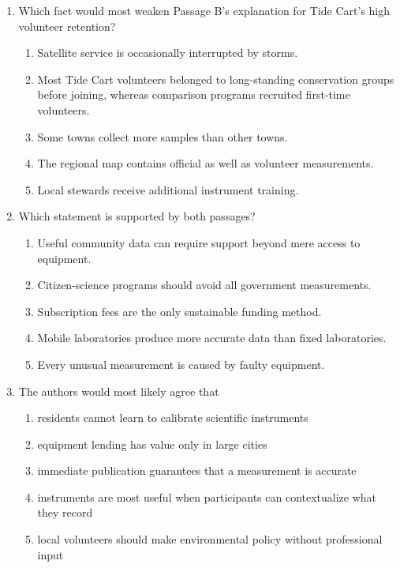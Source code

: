 \begin{enumerate}
\item Which fact would most weaken Passage B's explanation for Tide Cart's high volunteer retention?
\begin{enumerate}
\item Satellite service is occasionally interrupted by storms.
\item Most Tide Cart volunteers belonged to long-standing conservation groups before joining, whereas comparison programs recruited first-time volunteers.
\item Some towns collect more samples than other towns.
\item The regional map contains official as well as volunteer measurements.
\item Local stewards receive additional instrument training.
\end{enumerate}

\item Which statement is supported by both passages?
\begin{enumerate}
\item Useful community data can require support beyond mere access to equipment.
\item Citizen-science programs should avoid all government measurements.
\item Subscription fees are the only sustainable funding method.
\item Mobile laboratories produce more accurate data than fixed laboratories.
\item Every unusual measurement is caused by faulty equipment.
\end{enumerate}

\item The authors would most likely agree that
\begin{enumerate}
\item residents cannot learn to calibrate scientific instruments
\item equipment lending has value only in large cities
\item immediate publication guarantees that a measurement is accurate
\item instruments are most useful when participants can contextualize what they record
\item local volunteers should make environmental policy without professional input
\end{enumerate}


\end{enumerate}
